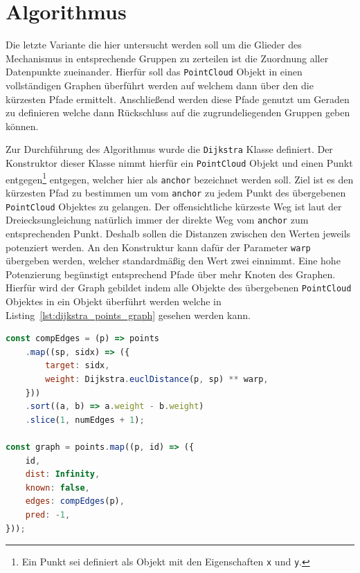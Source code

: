 \section{ Algorithmus}\label{ch:dijkstra}

Die letzte Variante die hier untersucht werden soll um die Glieder des Mechanismus in entsprechende Gruppen zu zerteilen ist die Zuordnung aller Datenpunkte zueinander.
Hierfür soll das \lstinline{PointCloud} Objekt in einen vollständigen Graphen überführt werden auf welchem dann über den  die kürzesten Pfade ermittelt.
Anschlie{\ss}end werden diese Pfade genutzt um Geraden zu definieren welche dann Rückschluss auf die zugrundeliegenden Gruppen geben können.

Zur Durchführung des  Algorithmus wurde die \lstinline{Dijkstra} Klasse definiert.
Der Konstruktor dieser Klasse nimmt hierfür ein \lstinline{PointCloud} Objekt und einen Punkt entgegen\footnote{Ein Punkt sei definiert als Objekt mit den Eigenschaften \lstinline{x} und \lstinline{y}.} entgegen, welcher hier als \lstinline{anchor} bezeichnet werden soll.
Ziel ist es den kürzesten Pfad zu bestimmen um vom \lstinline{anchor} zu jedem Punkt des übergebenen \lstinline{PointCloud} Objektes zu gelangen.
Der offensichtliche kürzeste Weg ist laut der Dreiecksungleichung natürlich immer der direkte Weg vom \lstinline{anchor} zum entsprechenden Punkt.
Deshalb sollen die Distanzen zwischen den Werten jeweils potenziert werden.
An den Konstruktur kann dafür der Parameter \lstinline{warp} übergeben werden, welcher standardmä{\ss}ig den Wert zwei einnimmt.
Eine hohe Potenzierung begünstigt entsprechend Pfade über mehr Knoten des Graphen.
Hierfür wird der Graph gebildet indem alle Objekte des übergebenen \lstinline{PointCloud} Objektes in ein Objekt überführt werden welche in Listing~\ref{lst:dijkstra_points_graph} gesehen werden kann.

\begin{lstlisting}[language=JavaScript, caption={Im \lstinline{Dijkstra} Konstruktor werden die Punkte des übergebenen \lstinline{PointCloud} Objektes in einen Graphen überführt.}, label={lst:dijkstra_points_graph}]
const compEdges = (p) => points
    .map((sp, sidx) => ({
        target: sidx,
        weight: Dijkstra.euclDistance(p, sp) ** warp,
    }))
    .sort((a, b) => a.weight - b.weight)
    .slice(1, numEdges + 1);

const graph = points.map((p, id) => ({
    id,
    dist: Infinity,
    known: false,
    edges: compEdges(p),
    pred: -1,
}));
\end{lstlisting}

